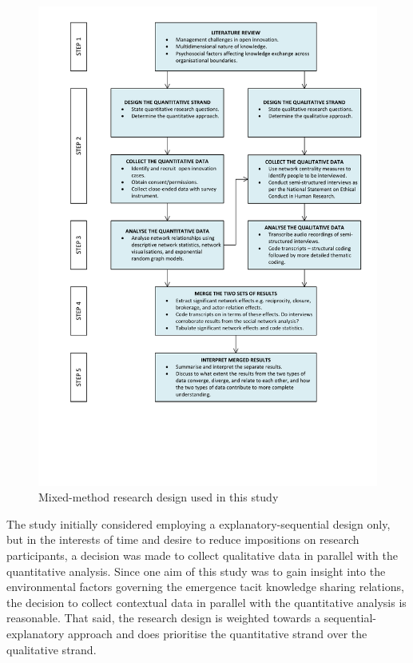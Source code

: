 \begin{figure}
    \centering
    \label{design}
    \includegraphics[width=0.9\linewidth]{Images/MixedMethodDesign20180903.pdf}
    \caption{Mixed\hyp{}method research design used in this study}
    \label{fig:researchplan20160402}
\end{figure}

The study initially considered employing a explanatory\hyp{}sequential design only, but in the interests of time and desire to reduce impositions on research participants, a decision was made to collect qualitative data in parallel with the quantitative analysis. Since one aim of this study was to gain insight into the environmental factors governing the emergence tacit knowledge sharing relations, the decision to collect contextual data in parallel with the quantitative analysis is reasonable. That said, the research design is weighted towards a sequential\hyp{}explanatory approach and does prioritise the quantitative strand over the qualitative strand. \medskip

